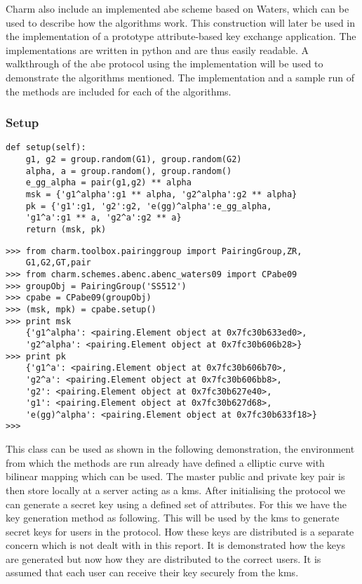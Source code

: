 Charm also include an implemented \gls{abe} scheme based on Waters\cite{abe_waters09}, which can be used to describe how the algorithms work. This construction will later be used in the implementation of a prototype attribute-based key exchange application. The implementations are written in python and are thus easily readable. A walkthrough of the \gls{abe} protocol using the implementation will be used to demonstrate the algorithms mentioned. The implementation and a sample run of the methods are included for each of the algorithms.

\subsubsection{Setup}


\begin{verbatim}
def setup(self):
    g1, g2 = group.random(G1), group.random(G2)
    alpha, a = group.random(), group.random()        
    e_gg_alpha = pair(g1,g2) ** alpha
    msk = {'g1^alpha':g1 ** alpha, 'g2^alpha':g2 ** alpha} 
    pk = {'g1':g1, 'g2':g2, 'e(gg)^alpha':e_gg_alpha, 
    'g1^a':g1 ** a, 'g2^a':g2 ** a}
    return (msk, pk)
\end{verbatim}

\begin{lstlisting}
>>> from charm.toolbox.pairinggroup import PairingGroup,ZR,
    G1,G2,GT,pair
>>> from charm.schemes.abenc.abenc_waters09 import CPabe09
>>> groupObj = PairingGroup('SS512')
>>> cpabe = CPabe09(groupObj)
>>> (msk, mpk) = cpabe.setup()
>>> print msk
    {'g1^alpha': <pairing.Element object at 0x7fc30b633ed0>, 
    'g2^alpha': <pairing.Element object at 0x7fc30b606b28>}
>>> print pk
    {'g1^a': <pairing.Element object at 0x7fc30b606b70>, 
    'g2^a': <pairing.Element object at 0x7fc30b606bb8>, 
    'g2': <pairing.Element object at 0x7fc30b627e40>, 
    'g1': <pairing.Element object at 0x7fc30b627d68>, 
    'e(gg)^alpha': <pairing.Element object at 0x7fc30b633f18>}
>>>
\end{lstlisting}

This class can be used as shown in the following demonstration, the environment from which the methods are run already have defined a elliptic curve with bilinear mapping which can be used. The master public and private key pair is then store locally at a server acting as a \gls{kms}. After initialising the protocol we can generate a secret key using a defined set of attributes. For this we have the key generation method as following. This will be used by the \gls{kms} to generate secret keys for users in the protocol. How these keys are distributed is a separate concern which is not dealt with in this report. It is demonstrated how the keys are generated but now how they are distributed to the correct users. It is assumed that each user can receive their key securely from the \gls{kms}.


